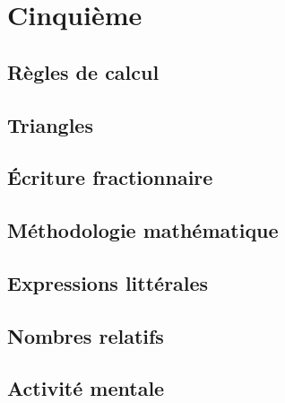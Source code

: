 \documentclass[a4paper,12pt]{book}
\begin{document}



\newpage



\tableofcontents

\newpage

\part{Cinquième}

\chapter{Règles de calcul}


\chapter{Triangles}


\chapter{Écriture fractionnaire}


\chapter{Méthodologie mathématique}


\chapter{Expressions littérales}


\chapter{Nombres relatifs}



\chapter{Activité mentale}

\end{document}
